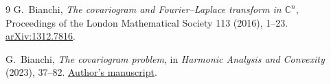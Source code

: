 \documentclass[11pt,a4paper]{article}
\begin{document}
\begin{thebibliography}{9}
G.~Bianchi, \emph{The covariogram and Fourier--Laplace transform in
$\mathbb C^n$}, Proceedings of the London Mathematical Society
113 (2016), 1--23.
\href{https://arxiv.org/abs/1312.7816}{arXiv:1312.7816}.

G.~Bianchi, \emph{The covariogram problem}, in
\emph{Harmonic Analysis and Convexity} (2023), 37--82.
\href{https://people.dimai.unifi.it/bianchi/lavori/covariogram_survey14.pdf}{Author's manuscript}.
\end{thebibliography}
\end{document}
